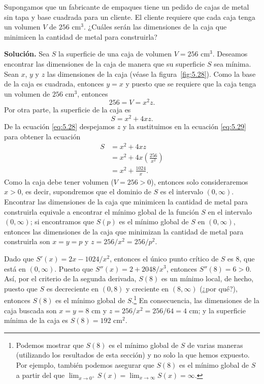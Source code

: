 \documentclass[12pt,a4paper]{book}
\begin{document}
    \begin{ejemplo}\label{ejm:97}
        Supongamos que un fabricante de empaques
        tiene un pedido de cajas de metal sin tapa y base cuadrada para un cliente.
        El cliente requiere que cada caja tenga un volumen $V$ de $256$ cm$^{3}$. ¿Cuáles
        serán las dimensiones de la caja que minimicen la cantidad de metal para
        construirla?

        \textbf{Solución.} Sea $S$ la superficie de una caja de volumen $V=256$ cm$^{3}$.
        Deseamos encontrar las dimensiones de la caja de manera que su superficie
        $S$ sea mínima. Sean $x$, $y$ y $z$ las dimensiones de la caja (véase la figura~\ref{fig:5.28}).
        Como la base de la caja es cuadrada, entonces $y=x$ y puesto que se requiere
        que la caja tenga un volumen de $256$ cm$^{3}$, entonces
        \begin{equation}\label{eq:5.28}
            256=V=x^{2}z.
        \end{equation}
        Por otra parte, la superficie de la caja es
        \begin{equation}\label{eq:5.29}
            S=x^{2}+4xz.
        \end{equation}
        De la ecuación \eqref{eq:5.28} despejamos $z$ y la sustituimos en la ecuación \eqref{eq:5.29}
        para obtener la ecuación
        \begin{align*}
            S&=x^{2}+4xz\\
            &=x^{2}+4x\left(\frac{256}{x^{2}}\right)\\
            &=x^{2}+\frac{1024}{x}.
        \end{align*}
        Como la caja debe tener volumen ($V=256>0$), entonces solo consideraremos
        $x>0$, es decir, supondremos que el dominio de $S$ es el intervalo
        $(0,\infty)$. Encontrar las dimensiones de la caja que minimicen la cantidad de
        metal para construirla equivale a encontrar el mínimo global de la función
        $S$ en el intervalo $(0,\infty)$; si encontramos que $S(p)$ es el mínimo global de $S$
        en $(0,\infty)$, entonces las dimensiones de la caja que minimizan la cantidad de
        metal para construirla son $x=y=p$ y $z=256/x^{2}=256/p^{2}$.

        Dado que $S'(x)=2x-1024/x^{2}$, entonces el único punto crítico de $S$ es $8$,
        que está en $(0,\infty)$. Puesto que $S''(x)=2+2048/x^{3}$, entonces $S''(8)=6>0$.
        Así, por el criterio de la segunda derivada, $S(8)$ es un mínimo local, de
        hecho, puesto que $S$ es decreciente en $(0,8)$ y creciente en $(8,\infty)$ (¿por qué?),
        entonces $S(8)$ es el mínimo global de $S$.\footnote{Podemos mostrar que $S(8)$ es el mínimo global de $S$ de varias maneras (utilizando
        los resultados de esta sección) y no solo la que hemos expuesto. Por ejemplo, también
        podemos asegurar que $S(8)$ es el mínimo global de $S$ a partir del que $\lim_{x\to 0^{+}}S(x)=
        \lim_{x\to\infty}S(x)=\infty$.} En consecuencia, las dimensiones
        de la caja buscada son $x=y=8$ cm y $z=256/x^{2}=256/64=4$ cm; y la
        superficie mínima de la caja es $S(8)=192$ cm$^{2}$.
    \end{ejemplo}
\end{document}
